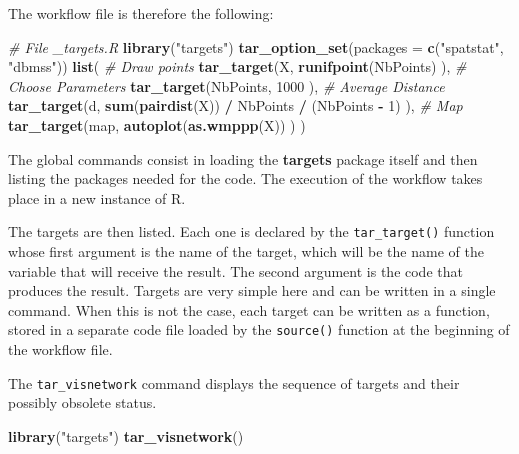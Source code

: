 \documentclass[
  12pt,
  american,
  a4paper,
  extrafontsizes,onecolumn,openright
  ]{memoir}
\newenvironment{Shaded}{\begin{snugshade}}{\end{snugshade}}
\newcommand{\AttributeTok}[1]{\textcolor[rgb]{0.13,0.29,0.53}{#1}}
\newcommand{\CommentTok}[1]{\textcolor[rgb]{0.56,0.35,0.01}{\textit{#1}}}
\newcommand{\DecValTok}[1]{\textcolor[rgb]{0.00,0.00,0.81}{#1}}
\newcommand{\FunctionTok}[1]{\textcolor[rgb]{0.13,0.29,0.53}{\textbf{#1}}}
\newcommand{\NormalTok}[1]{#1}
\newcommand{\SpecialCharTok}[1]{\textcolor[rgb]{0.81,0.36,0.00}{\textbf{#1}}}
\newcommand{\StringTok}[1]{\textcolor[rgb]{0.31,0.60,0.02}{#1}}
\begin{document}
The workflow file is therefore the following:

\scriptsize

\begin{Shaded}
\begin{Highlighting}[]
\CommentTok{\# File \_targets.R }
\FunctionTok{library}\NormalTok{(}\StringTok{"targets"}\NormalTok{)}
\FunctionTok{tar\_option\_set}\NormalTok{(}\AttributeTok{packages =} \FunctionTok{c}\NormalTok{(}\StringTok{"spatstat"}\NormalTok{, }\StringTok{"dbmss"}\NormalTok{))}
\FunctionTok{list}\NormalTok{(}
  \CommentTok{\# Draw points}
  \FunctionTok{tar\_target}\NormalTok{(X,}
    \FunctionTok{runifpoint}\NormalTok{(NbPoints)}
\NormalTok{  ),}
  \CommentTok{\# Choose Parameters}
  \FunctionTok{tar\_target}\NormalTok{(NbPoints,}
    \DecValTok{1000}
\NormalTok{  ),}
  \CommentTok{\# Average Distance}
  \FunctionTok{tar\_target}\NormalTok{(d,}
    \FunctionTok{sum}\NormalTok{(}\FunctionTok{pairdist}\NormalTok{(X)) }\SpecialCharTok{/}\NormalTok{ NbPoints }\SpecialCharTok{/}\NormalTok{ (NbPoints }\SpecialCharTok{{-}} \DecValTok{1}\NormalTok{)}
\NormalTok{  ),}
  \CommentTok{\# Map}
  \FunctionTok{tar\_target}\NormalTok{(map, }
    \FunctionTok{autoplot}\NormalTok{(}\FunctionTok{as.wmppp}\NormalTok{(X))}
\NormalTok{  )}
\NormalTok{)}
\end{Highlighting}
\end{Shaded}

\normalsize

The global commands consist in loading the \textbf{targets} package itself and then listing the packages needed for the code.
The execution of the workflow takes place in a new instance of R.

The targets are then listed.
Each one is declared by the \texttt{tar\_target()} function whose first argument is the name of the target, which will be the name of the variable that will receive the result.
The second argument is the code that produces the result.
Targets are very simple here and can be written in a single command.
When this is not the case, each target can be written as a function, stored in a separate code file loaded by the \texttt{source()} function at the beginning of the workflow file.

The \texttt{tar\_visnetwork} command displays the sequence of targets and their possibly obsolete status.

\scriptsize

\begin{Shaded}
\begin{Highlighting}[]
\FunctionTok{library}\NormalTok{(}\StringTok{"targets"}\NormalTok{)}
\FunctionTok{tar\_visnetwork}\NormalTok{()}
\end{Highlighting}
\end{Shaded}
\end{document}
